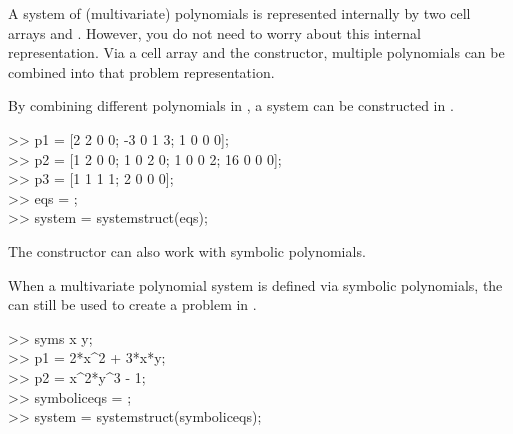 \documentclass{manual}
\begin{document}
            A system of (multivariate) polynomials is represented internally by two cell arrays  and . 
            However, you do not need to worry about this internal representation.
            Via a cell array and the  constructor, multiple polynomials can be combined into that problem representation.
            \begin{code}
                By combining different polynomials in , a system can be constructed in \maclab.
                \begin{codeblock}
                    >> p1 = {[2 2 0 0; -3 0 1 3; 1 0 0 0]}; \\
                    >> p2 = {[1 2 0 0; 1 0 2 0; 1 0 0 2; 16 0 0 0]}; \\
                    >> p3 = {[1 1 1 1; 2 0 0 0]}; \\
                    >> eqs = ; \\
                    >> system = systemstruct(eqs);
                \end{codeblock}
            \end{code}
            
            The  constructor can also work with symbolic polynomials.
            \begin{code}
                When a multivariate polynomial system is defined via symbolic polynomials, the  can still be used to create a problem in \maclab.
                \begin{codeblock}
                    >> syms \textcolor{string}{x y}; \\
                    >> p1 = 2*x\^{}2 + 3*x*y; \\
                    >> p2 = x\^{}2*y\^{}3 - 1; \\
                    >> symboliceqs = ; \\
                    >> system = systemstruct(symboliceqs);
                \end{codeblock}
            \end{code}
\end{document}
